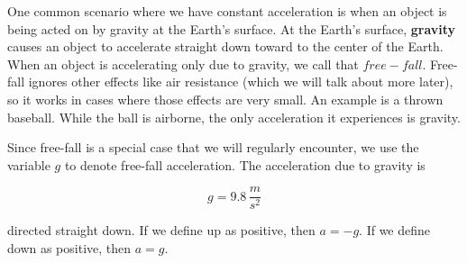 \documentclass[12pt]{book}
\begin{document}
One common scenario where we have constant acceleration is when an object is being acted on by gravity at the Earth's surface. At the Earth's surface, \textbf{gravity} causes an object to accelerate straight down toward to the center of the Earth. When an object is accelerating only due to gravity, we call that $free-fall$. Free-fall ignores other effects like air resistance (which we will talk about more later), so it works in cases where those effects are very small. An example is a thrown baseball. While the ball is airborne, the only acceleration it experiences is gravity. 

Since free-fall is a special case that we will regularly encounter, we use the variable $g$ to denote free-fall acceleration. The acceleration due to gravity is 

\begin{equation}
g = 9.8 \, \frac{m}{s^2}
\end{equation}

directed straight down. If we define up as positive, then $a = -g$. If we define down as positive, then $a = g$.
\end{document}

